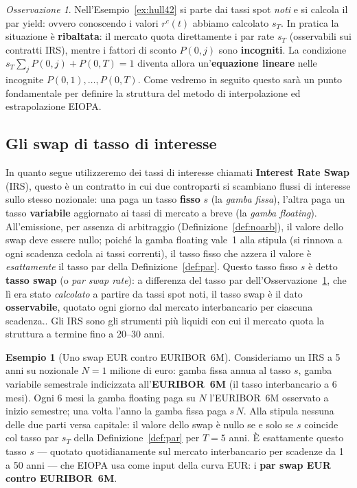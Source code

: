 \documentclass[11pt,a4paper]{article}
\theoremstyle{plain}
\theoremstyle{definition}
\newtheorem{esempio}[teorema]{Esempio}
\theoremstyle{remark}
\newtheorem*{osservazione}{Osservazione}
\begin{document}
\begin{osservazione}
\label{oss:inversione}
Nell'Esempio~\ref{ex:hull42} si parte dai tassi spot \emph{noti} e si calcola il par
yield: ovvero conoscendo i valori $r^c(t)$ abbiamo calcolato $s_T$. In pratica la situazione \`e \textbf{ribaltata}:
il mercato quota direttamente i par rate $s_T$ (osservabili sui contratti IRS), mentre i
fattori di sconto $P(0,j)$ sono \textbf{incogniti}. La condizione
$s_T\sum_{j}P(0,j)+P(0,T)=1$ diventa allora un'\textbf{equazione lineare} nelle
incognite $P(0,1),\ldots,P(0,T)$. Come vedremo in seguito questo sarà un punto fondamentale per definire la struttura del metodo di interpolazione ed estrapolazione EIOPA.
\end{osservazione}

\subsection{Gli swap di tasso di interesse}
\label{sec:swap}
In quanto segue utilizzeremo dei tassi di interesse chiamati \textbf{Interest Rate Swap} (IRS), questo \`e un contratto in cui due controparti si scambiano
flussi di interesse sullo stesso nozionale: una paga un tasso \textbf{fisso} $s$ (la
\emph{gamba fissa}), l'altra paga un tasso \textbf{variabile} aggiornato ai tassi di
mercato a breve (la \emph{gamba floating}). All'emissione, per assenza di arbitraggio
(Definizione~\ref{def:noarb}), il valore dello swap deve essere nullo; poich\'e la gamba
floating vale~1 alla stipula (si rinnova a ogni scadenza cedola ai tassi correnti), il
tasso fisso che azzera il valore \`e \emph{esattamente} il tasso par della
Definizione~\ref{def:par}. Questo tasso fisso $s$ \`e detto \textbf{tasso swap} (o
\emph{par swap rate}): a differenza del tasso par dell'Osservazione~\ref{oss:inversione},
che l\`i era stato \emph{calcolato} a partire da tassi spot noti, il tasso swap \`e il dato
\textbf{osservabile}, quotato ogni giorno dal mercato interbancario per ciascuna scadenza.. Gli IRS sono gli strumenti pi\`u liquidi con cui il mercato quota la struttura a
termine fino a 20--30 anni.

\begin{esempio}[Uno swap EUR contro EURIBOR~6M]
\label{ex:swap-euribor}
Consideriamo un IRS a 5 anni su nozionale $N=1$ milione di euro: gamba fissa annua al tasso
$s$, gamba variabile semestrale indicizzata all'\textbf{EURIBOR~6M} (il tasso interbancario a
6 mesi). Ogni 6 mesi la gamba floating paga su $N$ l'EURIBOR~6M osservato a inizio semestre;
una volta l'anno la gamba fissa paga $s\,N$. Alla stipula nessuna delle due parti versa
capitale: il valore dello swap \`e nullo se e solo se $s$ coincide col tasso par $s_T$ della
Definizione~\ref{def:par} per $T=5$ anni. \`E esattamente questo tasso $s$ --- quotato
quotidianamente sul mercato interbancario per scadenze da 1 a 50 anni --- che EIOPA usa come
input della curva EUR: i \textbf{par swap EUR contro EURIBOR~6M}.
\end{esempio}
\end{document}
